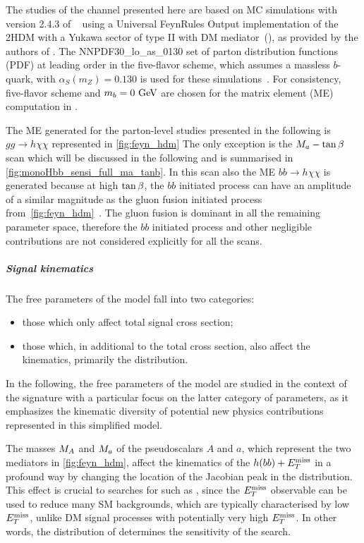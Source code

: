 The studies of the \monohbb channel presented here are based on MC simulations with version 2.4.3 of \mg~\cite{Alwall:2014hca} using a Universal FeynRules Output \cite{Degrande:2011ua} implementation of the 2HDM with a Yukawa sector of type II with DM mediator~(\hdma), as provided by the authors of \cite{Bauer:2017ota}. 
The NNPDF30\_lo\_as\_0130 set of parton distribution functions (PDF) at leading order in the five-flavor scheme, which assumes a massless $b$-quark, with $\alpha_{S}(m_{Z}) = 0.130$ is used for these simulations~\cite{Ball:2014uwa}. For consistency, five-flavor scheme and $m_b=0~\textrm{GeV}$ are chosen for the matrix element (ME) computation in \mg.

The ME generated for the parton-level studies presented in the following is $ g g \to h  \chi \chi$ represented in  \autoref{fig:feyn_hdm}
The only exception is the $M_{a}-\tan\beta$ scan which will be discussed in the following and is summarised in \autoref{fig:monoHbb_sensi_full_ma_tanb}. In this scan also the ME $b b \to h  \chi \chi$ is generated because at high $\tan\beta$, the $b b$ initiated process can have an amplitude of a similar magnitude as the gluon fusion initiated process from~\autoref{fig:feyn_hdm}~\cite{Bauer:2017ota}. 
The gluon fusion is dominant in all the remaining parameter space, therefore the $bb$ initiated process and other negligible contributions are not considered explicitly for all the scans.

\subparagraph{Signal kinematics}

The free parameters of the \hdma model fall into two categories:
\begin{itemize}
\item those which only affect total signal cross section;
\item those which, in additional to the total cross section, also affect the kinematics, primarily the \MET distribution.
\end{itemize}
In the following, the free parameters of the \hdma model are studied in the context of the \monohbb signature with a particular focus on the latter category of parameters, as it emphasizes the kinematic diversity of potential new physics contributions represented in this simplified model.


The masses $M_{A}$ and $M_{a}$ of the pseudoscalars $A$ and $a$, which represent the two mediators in \autoref{fig:feyn_hdm}, affect the kinematics of the $h(bb)+E_T^\mathrm{miss}$ in a profound way by changing the location of the Jacobian peak in the \MET distribution. This effect is crucial to searches for \monohbb such as  \cite{Aaboud:2017yqz}, since the $E_T^\mathrm{miss}$ observable can be used to reduce many SM backgrounds, which are typically characterised by low  $E_T^\mathrm{miss}$, unlike DM signal processes with potentially very high $E_T^\mathrm{miss}$. In other words, the distribution of \met determines the sensitivity of the search.

